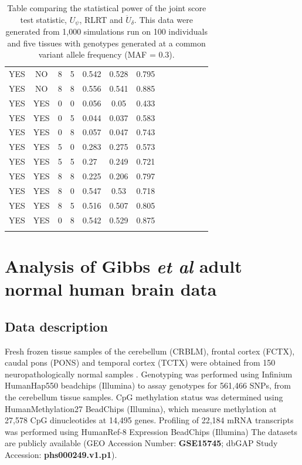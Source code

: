 \documentclass[hidelinks]{article}
\begin{document}
\begin{center}
\begin{longtable}{lclclclclclc|c|}
YES & NO & 8 & 5 & 0.542 & 0.528 & 0.795 \\
YES & NO & 8 & 8 & 0.556 & 0.541 & 0.885 \\ \hdashline
YES & YES & 0 & 0 & 0.056 & 0.05 & 0.433 \\
YES & YES & 0 & 5 & 0.044 & 0.037 & 0.583 \\
YES & YES & 0 & 8 & 0.057 & 0.047 & 0.743 \\
YES & YES & 5 & 0 & 0.283 & 0.275 & 0.573 \\
YES & YES & 5 & 5 & 0.27 & 0.249 & 0.721 \\
YES & YES & 8 & 8 & 0.225 & 0.206 & 0.797 \\
YES & YES & 8 & 0 & 0.547 & 0.53 & 0.718 \\
YES & YES & 8 & 5 & 0.516 & 0.507 & 0.805 \\
YES & YES & 0 & 8 & 0.542 & 0.529 & 0.875 \\
\hline\hline
\caption{Table comparing the statistical power of the joint score test statistic, $U_\psi$, RLRT and $\ddot{U}_{\delta}$. This data were generated from 1,000 simulations run on 100 individuals and five tissues with genotypes generated at a common variant allele frequency (MAF = 0.3). }
\end{longtable}
\end{center}

\section{Analysis of Gibbs \emph{et al} adult normal human brain data}

\subsection{Data description}
Fresh frozen tissue samples of the cerebellum (CRBLM), frontal cortex (FCTX), caudal pons (PONS) and temporal cortex (TCTX) were obtained from 150 neuropathologically normal samples \cite{gibbs}. Genotyping was performed using Infinium HumanHap550 beadchips (Illumina) to assay genotypes for 561,466 SNPs, from the cerebellum tissue samples. CpG methylation status was determined using HumanMethylation27 BeadChips (Illumina), which measure methylation at 27,578 CpG dinucleotides at 14,495 genes. Profiling of 22,184 mRNA transcripts was performed using HumanRef-8 Expression BeadChips (Illumina) The datasets are publicly available (GEO Accession Number: \textbf{GSE15745}; dbGAP Study Accession: \textbf{phs000249.v1.p1}). 
\end{document}
